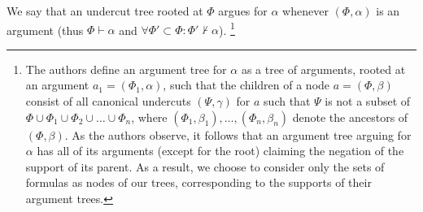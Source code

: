 \documentclass[version=3.21, pagesize, twoside=off, bibliography=totoc, DIV=calc, fontsize=12pt, a4paper, french, english]{scrartcl}
\begin{document}
We say that an undercut tree rooted at $\Phi$ argues for $\alpha$ whenever $(\Phi, \alpha)$ is an argument (thus $\Phi ⊢ \alpha$ and $\forall \Phi' \subset \Phi: \Phi' ⊬ \alpha$).
\footnote{The authors define an argument tree for $\alpha$ as a tree of arguments, rooted at an argument $a_1 = (\Phi_1, \alpha)$, such that the children of a node $a = (\Phi, \beta)$ consist of all canonical undercuts $(\Psi, \gamma)$ for $a$ such that $\Psi$ is not a subset of $\Phi \cup \Phi_1 \cup \Phi_2 \cup … \cup \Phi_n$, where $(Φ_1, \beta_1), …, (Φ_n, \beta_n)$ denote the ancestors of $(\Phi, \beta)$.
As the authors observe, it follows that an argument tree arguing for $\alpha$ has all of its arguments (except for the root) claiming the negation of the support of its parent. As a result, we choose to consider only the sets of formulas as nodes of our trees, corresponding to the supports of their argument trees.
}
\end{document}
